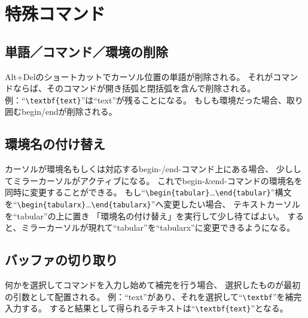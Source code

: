 \section{特殊コマンド}

\subsection{単語／コマンド／環境の削除}

Alt+Delのショートカットでカーソル位置の単語が削除される。
それがコマンドならば、そのコマンドが開き括弧と閉括弧を含んで削除される。
例：``\verb+\textbf{text}+''は``text''が残ることになる。
もしも環境だった場合、取り囲むbegin/endが削除される。

\subsection{環境名の付け替え}

カーソルが環境名もしくは対応するbegin-/end-コマンド上にある場合、
少ししてミラーカーソルがアクティブになる。
これでbegin-\&end-コマンドの環境名を同時に変更することができる。
もし``\verb+\begin{tabular}+\ldots{}\verb+\end{tabular}+''構文
を``\verb+\begin{tabularx}+\ldots{}\verb+\end{tabularx}+''へ変更したい場合、
テキストカーソルを``tabular''の上に置き
「環境名の付け替え」を実行して少し待てばよい。
すると、ミラーカーソルが現れて``tabular''を``tabularx''に変更できるようになる。

\subsection{バッファの切り取り}

何かを選択してコマンドを入力し始めて補完を行う場合、
選択したものが最初の引数として配置される。
例：``text''があり、それを選択して``\verb+\textbf+''を補完入力する。
すると結果として得られるテキストは``\verb+\textbf{text}+''となる。
